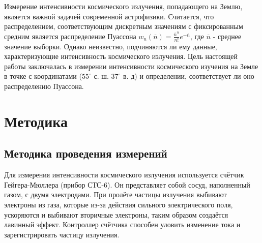 \documentclass[12pt]{article}
\begin{document}
Измерение интенсивности космического излучения, попадающего на Землю, является важной задачей современной астрофизики. Считается, что
распределением, соответствующим дискретным значениям с фиксированным средним является распределение Пуассона $w_n(\overline{n}) = \frac{{\overline{n}}^{n}}{n!}e^{-\overline{n}}$, 
где $\overline{n}$ - среднее значение выборки. Однако неизвестно, подчиняются ли ему данные, характеризующие интенсивность космического излучения.
Цель настоящей работы заключалась в измерении интенсивности космического изучения на Земле в точке с координатами ($55^\circ$ с. ш. $37^\circ$ в. д)
и определении, соответствует ли оно распределению Пуассона.

\section{Методика}
\subsection{Методика проведения измерений}
Для измерения интенсивности космического излучения используется счётчик Гейгера-Мюллера (прибор СТС-6). Он представляет собой сосуд,
наполненный газом, с двумя электродами. При пролёте частицы излучения выбивают электроны из газа, которые из-за действия сильного электрического
поля, ускоряются и выбивают вторичные электроны, таким образом создаётся лавинный эффект. Контроллер счётчика способен уловить
изменение тока и зарегистрировать частицу излучения.
\end{document}
